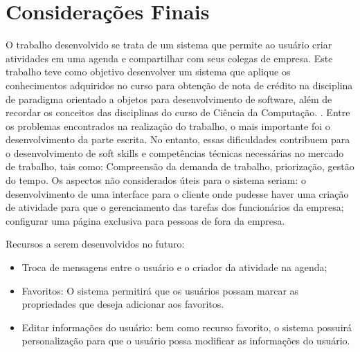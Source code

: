 

\chapter{Considera\c{c}\~{o}es Finais}


O trabalho desenvolvido se trata de um sistema que permite ao usuário criar atividades em uma agenda e compartilhar com seus colegas de empresa.
Este trabalho teve como objetivo desenvolver um sistema que aplique os conhecimentos adquiridos no curso para obtenção de nota de crédito na disciplina de paradigma orientado a objetos para desenvolvimento de software, além de recordar os conceitos das disciplinas do curso de Ciência da Computação.
. Entre os problemas encontrados na realização do trabalho, o mais importante foi o desenvolvimento da parte escrita. No entanto, essas dificuldades contribuem para o desenvolvimento de soft skills e competências técnicas necessárias no mercado de trabalho, tais como: Compreensão da demanda de trabalho, priorização, gestão do tempo. Os aspectos não considerados úteis para o sistema seriam: o desenvolvimento de uma interface para o cliente onde pudesse haver uma criação de atividade para que o gerenciamento das tarefas dos funcionários da empresa; configurar uma página exclusiva para pessoas de fora da empresa.

Recursos a serem desenvolvidos no futuro:
\begin{itemize}
    \item  Troca de mensagens entre o usuário e o criador da atividade na agenda;
    \item  Favoritos: O sistema permitirá que os usuários possam marcar as propriedades que deseja adicionar aos favoritos.
    \item  Editar informações do usuário: bem como recurso favorito, o sistema possuirá personalização para que o usuário possa modificar as informações do usuário.

\end{itemize}



